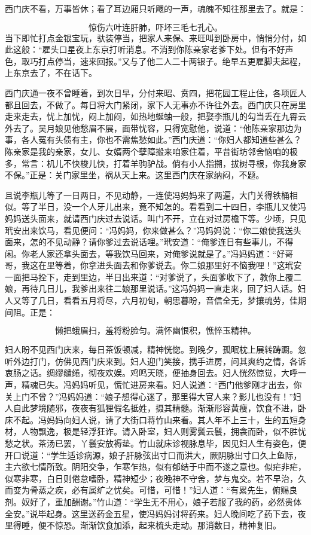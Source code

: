 西门庆不看，万事皆休；看了耳边厢只听飕的一声，魂魄不知往那里去了。就是：

\[
惊伤六叶连肝肺，吓坏三毛七孔心。
\]
当下即忙打点金银宝玩，驮装停当，把家人来保、来旺叫到卧房中，悄悄分付，如此这般：“雇头口星夜上东京打听消息。不消到你陈亲家老爹下处。但有不好声色，取巧打点停当，速来回报。”又与了他二人二十两银子。绝早五更雇脚夫起程，上东京去了，不在话下。

西门庆通一夜不曾睡着，到次日早，分付来昭、贲四，把花园工程止住，各项匠人都且回去，不做了。每日将大门紧闭，家下人无事亦不许往外去。西门庆只在房里走来走去，忧上加忧，闷上加闷，如热地蜒蚰一般，把娶李瓶儿的勾当丢在九霄云外去了。吴月娘见他愁眉不展，面带忧容，只得宽慰他，说道：“他陈亲家那边为事，各人冤有头债有主，你也不需焦愁如此。”西门庆道：“你妇人都知道些甚么？陈亲家是我的亲家，女儿、女婿两个孽障搬来咱家住着，平昔街坊邻舍恼咱的极多，常言：机儿不快梭儿快，打着羊驹驴战。倘有小人指搠，拔树寻根，你我身家不保。”正是：关门家里坐，祸从天上来。这里西门庆在家纳闷，不题。

且说李瓶儿等了一日两日，不见动静，一连使冯妈妈来了两遍，大门关得铁桶相似。等了半日，没一个人牙儿出来，竟不知怎的。看看到二十四日，李瓶儿又使冯妈妈送头面来，就请西门庆过去说话。叫门不开，立在对过房檐下等。少顷，只见玳安出来饮马，看见便问：“冯妈妈，你来做甚么？”冯妈妈说：“你二娘使我送头面来，怎的不见动静？请你爹过去说话哩。”玳安道：“俺爹连日有些事儿，不得闲。你老人家还拿头面去，等我饮马回来，对俺爹说就是了。”冯妈妈道：“好哥哥，我这在里等着，你拿进头面去和你爹说去。你二娘那里好不恼我哩！”这玳安一面把马拴下，走到里边，半日出来道：“对爹说了，头面爹收下了，教你上覆二娘，再待几日儿，我爹出来往二娘那里说话。”这冯妈妈一直走来，回了妇人话。妇人又等了几日，看看五月将尽，六月初旬，朝思暮盼，音信全无，梦攘魂劳，佳期间阻。正是：

\[
懒把蛾眉扫，羞将粉脸匀。
满怀幽恨积，憔悴玉精神。
\]

妇人盼不见西门庆来，每日茶饭顿减，精神恍惚。到晚夕，孤眠枕上展转踌蹰。忽听外边打门，仿佛见西门庆来到。妇人迎门笑接，携手进房，问其爽约之情，各诉衷肠之话。绸缪缱绻，彻夜欢娱。鸡鸣天晓，便抽身回去。妇人恍然惊觉，大呼一声，精魂已失。冯妈妈听见，慌忙进房来看。妇人说道：“西门他爹刚才出去，你关上门不曾？”冯妈妈道：“娘子想得心迷了，那里得大官人来？影儿也没有！”妇人自此梦境随邪，夜夜有狐狸假名抵姓，摄其精髓。渐渐形容黄瘦，饮食不进，卧床不起。冯妈妈向妇人说，请了大街口蒋竹山来看。其人年不上三十，生的五短身材，人物飘逸，极是轻浮狂诈。请入卧室，妇人则雾鬓云鬟，拥衾而卧，似不胜忧愁之状。茶汤已罢，丫鬟安放褥垫。竹山就床诊视脉息毕，因见妇人生有姿色，便开口说道：“学生适诊病源，娘子肝脉弦出寸口而洪大，厥阴脉出寸口久上鱼际，主六欲七情所致。阴阳交争，乍寒乍热，似有郁结于中而不遂之意也。似疟非疟，似寒非寒，白日则倦怠嗜卧，精神短少；夜晚神不守舍，梦与鬼交。若不早治，久而变为骨蒸之疾，必有属纩之忧矣。可惜，可惜！”妇人道：“有累先生，俯赐良剂。奴好了，重加酬谢。”竹山道：“学生无不用心，娘子若服了我的药，必然贵体全安。”说毕起身。这里送药金五星，使冯妈妈讨将药来。妇人晚间吃了药下去，夜里得睡，便不惊恐。渐渐饮食加添，起来梳头走动。那消数日，精神复旧。

